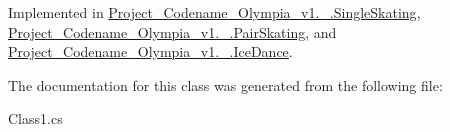 Implemented in \hyperlink{classProject__Codename__Olympia__v1_1_1__0_1_1SingleSkating_a0f1837cfe29187ca1c2402f6312f2465}{Project\+\_\+\+Codename\+\_\+\+Olympia\+\_\+v1.\+\_.\+Single\+Skating}, \hyperlink{classProject__Codename__Olympia__v1_1_1__0_1_1PairSkating_aef6f7313446386c4e6bdf8a438e246a1}{Project\+\_\+\+Codename\+\_\+\+Olympia\+\_\+v1.\+\_.\+Pair\+Skating}, and \hyperlink{classProject__Codename__Olympia__v1_1_1__0_1_1IceDance_ad7e7867e61839151b62fd0bbafc09fad}{Project\+\_\+\+Codename\+\_\+\+Olympia\+\_\+v1.\+\_.\+Ice\+Dance}.



The documentation for this class was generated from the following file\+:\begin{DoxyCompactItemize}
\item 
Class1.\+cs\end{DoxyCompactItemize}
